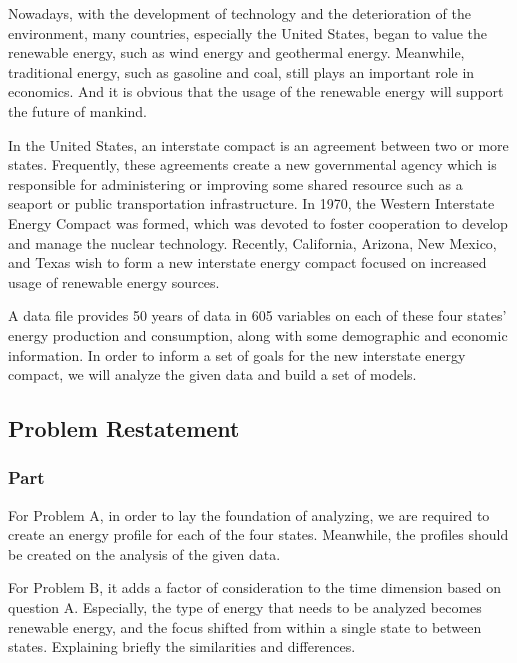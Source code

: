 \documentclass[a4paper,11pt]{article}
\begin{document}
\par Nowadays, with the development of technology and the deterioration of the environment, many countries, especially the United States, began to value the renewable energy, such as wind energy and geothermal energy. Meanwhile, traditional energy, such as gasoline and coal, still plays an important role in economics. And it is obvious that the usage of the renewable energy will support the future of mankind.
\par In the United States, an interstate compact is an agreement between two or more states. Frequently, these agreements create a new governmental agency which is responsible for administering or improving some shared resource such as a seaport or public transportation infrastructure.\cite{1} In 1970, the Western Interstate Energy Compact was formed, which was devoted to foster cooperation to develop and manage the nuclear technology. Recently, California, Arizona, New Mexico, and Texas wish to form a new interstate energy compact focused on increased usage of renewable energy sources. 
\par A data file provides 50 years of data in 605 variables on each of these four states' energy production and consumption, along with some demographic and economic information. In order to inform a set of goals for the new interstate energy compact, we will analyze the given data and build a set of models.


\subsection{Problem Restatement}
\subsubsection*{Part \uppercase\expandafter{}}
\par For Problem A, in order to lay the foundation of analyzing, we are required to create an energy profile for each of the four states. Meanwhile, the profiles should be created on the analysis of the given data.

\par For Problem B, it adds a factor of consideration to the time dimension based on question A. Especially, the type of energy that needs to be analyzed becomes renewable energy, and the focus shifted from within a single state to between states. Explaining briefly the similarities and differences.
\end{document}
